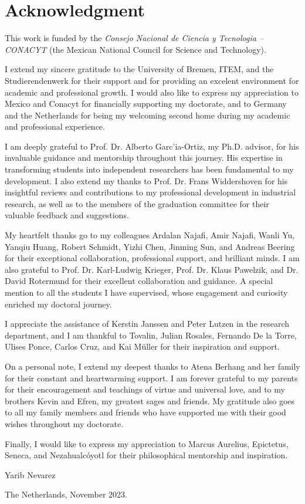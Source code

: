 \chapter*{Acknowledgment}
\thispagestyle{empty}
This work is funded by the \textit{Consejo Nacional de Ciencia y Tecnologia -- CONACYT} (the Mexican National Council for Science and Technology).

I extend my sincere gratitude to the University of Bremen, ITEM, and the Studierendenwerk for their support and for providing an excelent environment for academic and professional growth. I would also like to express my appreciation to Mexico and Conacyt for financially supporting my doctorate, and to Germany and the Netherlands for being my welcoming second home during my academic and professional experience.

I am deeply grateful to Prof. Dr. Alberto Garc'ia-Ortiz, my Ph.D. advisor, for his invaluable guidance and mentorship throughout this journey. His expertise in transforming students into independent researchers has been fundamental to my development. I also extend my thanks to Prof. Dr. Frans Widdershoven for his insightful reviews and contributions to my professional development in industrial research, as well as to the members of the graduation committee for their valuable feedback and suggestions.

My heartfelt thanks go to my colleagues Ardalan Najafi, Amir Najafi, Wanli Yu, Yanqiu Huang, Robert Schmidt, Yizhi Chen, Jinming Sun, and Andreas Beering for their exceptional collaboration, professional support, and brilliant minds. I am also grateful to Prof. Dr. Karl-Ludwig Krieger, Prof. Dr. Klaus Pawelzik, and Dr. David Rotermund for their excellent collaboration and guidance. A special mention to all the students I have supervised, whose engagement and curiosity enriched my doctoral journey.

I appreciate the assistance of Kerstin Janssen and Peter Lutzen in the research department, and I am thankful to Tovalin, Julian Rosales, Fernando De la Torre, Ulises Ponce, Carlos Cruz, and Kai M\"uller for their inspiration and support.

On a personal note, I extend my deepest thanks to Atena Berhang and her family for their constant and heartwarming support. I am forever grateful to my parents for their encouragement and teachings of virtue and universal love, and to my brothers Kevin and Efren, my greatest sages and friends. My gratitude also goes to all my family members and friends who have supported me with their good wishes throughout my doctorate.

Finally, I would like to express my appreciation to Marcus Aurelius, Epictetus, Seneca, and Nezahualc\'oyotl for their philosophical mentorship and inspiration.

Yarib Nevarez

The Netherlands, November 2023.

